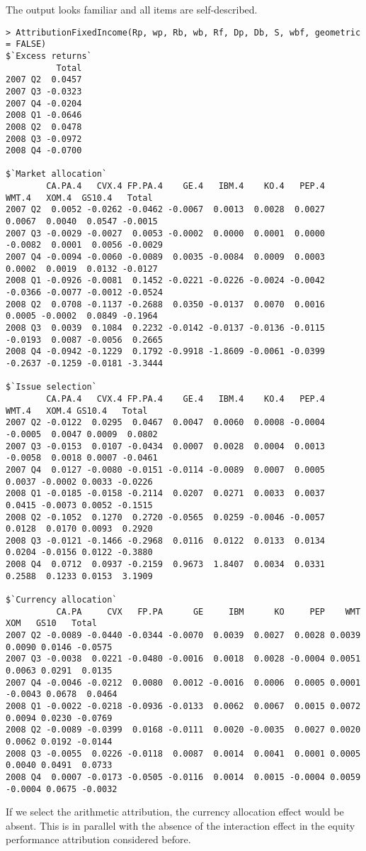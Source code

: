 \documentclass[11pt,a4paper]{article}
\begin{document}
The output looks familiar and all items are self-described.
\begingroup
\fontsize{9pt}{12pt}\selectfont
\begin{verbatim}
> AttributionFixedIncome(Rp, wp, Rb, wb, Rf, Dp, Db, S, wbf, geometric = FALSE)
$`Excess returns`
          Total
2007 Q2  0.0457
2007 Q3 -0.0323
2007 Q4 -0.0204
2008 Q1 -0.0646
2008 Q2  0.0478
2008 Q3 -0.0972
2008 Q4 -0.0700

$`Market allocation`
        CA.PA.4   CVX.4 FP.PA.4    GE.4   IBM.4    KO.4   PEP.4   WMT.4   XOM.4  GS10.4   Total
2007 Q2  0.0052 -0.0262 -0.0462 -0.0067  0.0013  0.0028  0.0027  0.0067  0.0040  0.0547 -0.0015
2007 Q3 -0.0029 -0.0027  0.0053 -0.0002  0.0000  0.0001  0.0000 -0.0082  0.0001  0.0056 -0.0029
2007 Q4 -0.0094 -0.0060 -0.0089  0.0035 -0.0084  0.0009  0.0003  0.0002  0.0019  0.0132 -0.0127
2008 Q1 -0.0926 -0.0081  0.1452 -0.0221 -0.0226 -0.0024 -0.0042 -0.0366 -0.0077 -0.0012 -0.0524
2008 Q2  0.0708 -0.1137 -0.2688  0.0350 -0.0137  0.0070  0.0016  0.0005 -0.0002  0.0849 -0.1964
2008 Q3  0.0039  0.1084  0.2232 -0.0142 -0.0137 -0.0136 -0.0115 -0.0193  0.0087 -0.0056  0.2665
2008 Q4 -0.0942 -0.1229  0.1792 -0.9918 -1.8609 -0.0061 -0.0399 -0.2637 -0.1259 -0.0181 -3.3444

$`Issue selection`
        CA.PA.4   CVX.4 FP.PA.4    GE.4   IBM.4    KO.4   PEP.4   WMT.4   XOM.4 GS10.4   Total
2007 Q2 -0.0122  0.0295  0.0467  0.0047  0.0060  0.0008 -0.0004 -0.0005  0.0047 0.0009  0.0802
2007 Q3 -0.0153  0.0107 -0.0434  0.0007  0.0028  0.0004  0.0013 -0.0058  0.0018 0.0007 -0.0461
2007 Q4  0.0127 -0.0080 -0.0151 -0.0114 -0.0089  0.0007  0.0005  0.0037 -0.0002 0.0033 -0.0226
2008 Q1 -0.0185 -0.0158 -0.2114  0.0207  0.0271  0.0033  0.0037  0.0415 -0.0073 0.0052 -0.1515
2008 Q2 -0.1052  0.1270  0.2720 -0.0565  0.0259 -0.0046 -0.0057  0.0128  0.0170 0.0093  0.2920
2008 Q3 -0.0121 -0.1466 -0.2968  0.0116  0.0122  0.0133  0.0134  0.0204 -0.0156 0.0122 -0.3880
2008 Q4  0.0712  0.0937 -0.2159  0.9673  1.8407  0.0034  0.0331  0.2588  0.1233 0.0153  3.1909

$`Currency allocation`
          CA.PA     CVX   FP.PA      GE     IBM      KO     PEP    WMT     XOM   GS10   Total
2007 Q2 -0.0089 -0.0440 -0.0344 -0.0070  0.0039  0.0027  0.0028 0.0039  0.0090 0.0146 -0.0575
2007 Q3 -0.0038  0.0221 -0.0480 -0.0016  0.0018  0.0028 -0.0004 0.0051  0.0063 0.0291  0.0135
2007 Q4 -0.0046 -0.0212  0.0080  0.0012 -0.0016  0.0006  0.0005 0.0001 -0.0043 0.0678  0.0464
2008 Q1 -0.0022 -0.0218 -0.0936 -0.0133  0.0062  0.0067  0.0015 0.0072  0.0094 0.0230 -0.0769
2008 Q2 -0.0089 -0.0399  0.0168 -0.0111  0.0020 -0.0035  0.0027 0.0020  0.0062 0.0192 -0.0144
2008 Q3 -0.0055  0.0226 -0.0118  0.0087  0.0014  0.0041  0.0001 0.0005  0.0040 0.0491  0.0733
2008 Q4  0.0007 -0.0173 -0.0505 -0.0116  0.0014  0.0015 -0.0004 0.0059 -0.0004 0.0675 -0.0032
\end{verbatim}
\endgroup
If we select the arithmetic attribution, the currency allocation effect would be absent. This is in parallel with the absence of the interaction effect in the equity performance attribution considered before.
\end{document}
